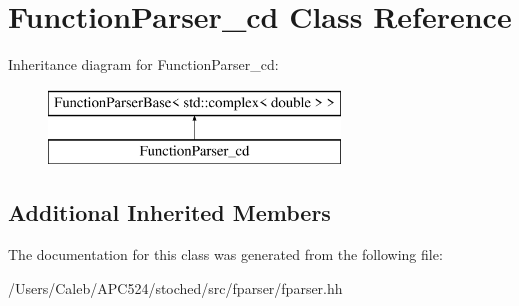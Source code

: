 \hypertarget{class_function_parser__cd}{}\section{Function\+Parser\+\_\+cd Class Reference}
\label{class_function_parser__cd}
Inheritance diagram for Function\+Parser\+\_\+cd\+:\begin{figure}[H]
\begin{center}
\leavevmode
\includegraphics[height=2.000000cm]{class_function_parser__cd}
\end{center}
\end{figure}
\subsection*{Additional Inherited Members}


The documentation for this class was generated from the following file\+:\begin{DoxyCompactItemize}
\item 
/\+Users/\+Caleb/\+A\+P\+C524/stoched/src/fparser/fparser.\+hh\end{DoxyCompactItemize}
